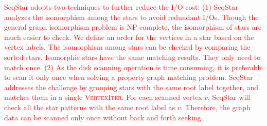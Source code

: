 \textcolor{red}{SeqStar adopts two techniques to further reduce the I/O cost:
(1) SeqStar analyzes the isomorphism among the stars to avoid redundant I/Os.
Though the general graph isomorphism problem is NP complete, the isomorphism of stars are much easier to check.
We define an order for the vertices in a star based on the vertex labels. The isomorphism among stars can be checked by comparing the sorted stars.
Isomorphic stars have the same matching results. They only need to match once.
(2) As the disk scanning operation is time consuming, it is preferable to scan it only once when solving a property graph matching problem.
SeqStar addresses the challenge by grouping stars with the same root label together,
and matches them in a single \textsc{VertexIter}.
For each scanned vertex $v$, SeqStar will check all the star patterns with the same root label as $v$.
Therefore, the graph data can be scanned only once without back and forth seeking.
}
